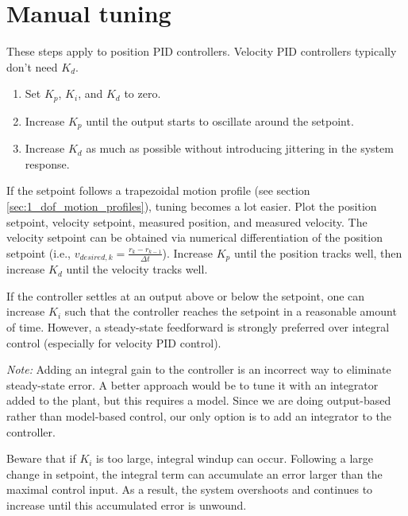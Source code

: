 \section{Manual tuning}

These steps apply to position PID controllers. Velocity PID controllers
typically don't need $K_d$.
\begin{enumerate}
  \item Set $K_p$, $K_i$, and $K_d$ to zero.
  \item Increase $K_p$ until the \gls{output} starts to oscillate around the
    \gls{setpoint}.
  \item Increase $K_d$ as much as possible without introducing jittering in the
    \gls{system response}.
\end{enumerate}

If the \gls{setpoint} follows a trapezoidal motion profile (see section
\ref{sec:1_dof_motion_profiles}), tuning becomes a lot easier. Plot the position
\gls{setpoint}, velocity \gls{setpoint}, measured position, and measured
velocity. The velocity \gls{setpoint} can be obtained via numerical
differentiation of the position \gls{setpoint} (i.e.,
$v_{desired,k} = \frac{r_k - r_{k-1}}{\Delta t}$). Increase $K_p$ until the
position tracks well, then increase $K_d$ until the velocity tracks well.

If the \gls{controller} settles at an \gls{output} above or below the
\gls{setpoint}, one can increase $K_i$ such that the \gls{controller} reaches
the \gls{setpoint} in a reasonable amount of time. However, a steady-state
feedforward is strongly preferred over integral control (especially for velocity
PID control).
\begin{remark}
  \textit{Note:} Adding an integral gain to the \gls{controller} is an incorrect
  way to eliminate \gls{steady-state error}. A better approach would be to tune
  it with an integrator added to the \gls{plant}, but this requires a
  \gls{model}. Since we are doing output-based rather than model-based control,
  our only option is to add an integrator to the \gls{controller}.
\end{remark}

Beware that if $K_i$ is too large, integral windup can occur. Following a large
change in \gls{setpoint}, the integral term can accumulate an error larger than
the maximal \gls{control input}. As a result, the system overshoots and
continues to increase until this accumulated error is unwound.
